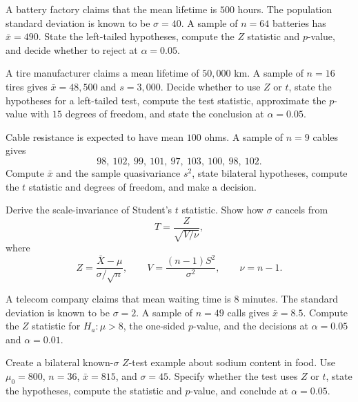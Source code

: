 \begin{problema}\label{prob:c7ea911}
A battery factory claims that the mean lifetime is $500$ hours. The population standard deviation is known to be $\sigma=40$. A sample of $n=64$ batteries has $\bar x=490$. State the left-tailed hypotheses, compute the $Z$ statistic and $p$-value, and decide whether to reject at $\alpha=0.05$.
\end{problema}

\begin{problema}\label{prob:f6ad523}
A tire manufacturer claims a mean lifetime of $50{,}000$ km. A sample of $n=16$ tires gives $\bar x=48{,}500$ and $s=3{,}000$. Decide whether to use $Z$ or $t$, state the hypotheses for a left-tailed test, compute the test statistic, approximate the $p$-value with $15$ degrees of freedom, and state the conclusion at $\alpha=0.05$.
\end{problema}

\begin{problema}\label{prob:4072ece}
Cable resistance is expected to have mean $100$ ohms. A sample of $n=9$ cables gives
\[
	98,\ 102,\ 99,\ 101,\ 97,\ 103,\ 100,\ 98,\ 102.
\]
Compute $\bar x$ and the sample quasivariance $s^2$, state bilateral hypotheses, compute the $t$ statistic and degrees of freedom, and make a decision.
\end{problema}

\begin{problema}\label{prob:6c535e4}
Derive the scale-invariance of Student's $t$ statistic. Show how $\sigma$ cancels from
\[
	T=\frac{Z}{\sqrt{V/\nu}},
\]
where
\[
	Z=\frac{\bar X-\mu}{\sigma/\sqrt n},\qquad
	V=\frac{(n-1)S^2}{\sigma^2},\qquad
	\nu=n-1.
\]
\end{problema}

\begin{problema}\label{prob:a9a27c5}
A telecom company claims that mean waiting time is $8$ minutes. The standard deviation is known to be $\sigma=2$. A sample of $n=49$ calls gives $\bar x=8.5$. Compute the $Z$ statistic for $H_a:\mu>8$, the one-sided $p$-value, and the decisions at $\alpha=0.05$ and $\alpha=0.01$.
\end{problema}

\begin{problema}\label{prob:8843fed}
Create a bilateral known-$\sigma$ $Z$-test example about sodium content in food. Use $\mu_0=800$, $n=36$, $\bar x=815$, and $\sigma=45$. Specify whether the test uses $Z$ or $t$, state the hypotheses, compute the statistic and $p$-value, and conclude at $\alpha=0.05$.
\end{problema}

